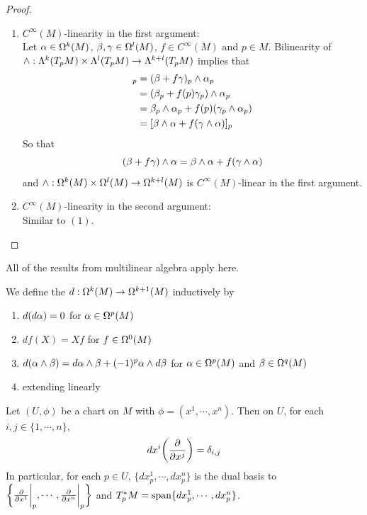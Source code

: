 \documentclass{book}
\begin{document}
	\begin{proof}\
	\begin{enumerate}
	\item 
	$C^{\infty}(M)$-linearity in the first argument:\\
	Let $\alpha \in \Omega^k(M)$, $\beta, \gamma \in \Omega^l(M)$, $f \in C^{\infty}(M)$ and $p \in M$. Bilinearity of $\wedge: \Lambda^k(T_pM) \times \Lambda^l(T_pM) \rightarrow \Lambda^{k+l}(T_pM)$ implies that
	\begin{align*}
	[(\be + f \gam ) \wedge \al]_p 
	& = (\be + f \gam)_p \wedge \al_p  \\
	& =(\be_p + f(p) \gam_p) \wedge \al_p \\
	& = \be_p \wedge \al_p + f(p)( \gam_p \wedge \al_p) \\
	& =  [\be \wedge \al + f (\gam \wedge \al)]_p \\
	\end{align*}
	So that $$(\beta + f \gamma ) \wedge \alpha = \beta \wedge \alpha  + f  (\gamma \wedge \alpha)$$ and $\wedge: \Omega^k(M) \times \Omega^l(M) \rightarrow \Omega^{k+l}(M) $ is $C^{\infty}(M)$-linear in the first argument. 
	\item $C^{\infty}(M)$-linearity in the second argument:\\
	Similar to $(1)$.
	\end{enumerate}
	\end{proof}
	
	\begin{note}
		All of the results from multilinear algebra apply here.
	\end{note}

	\begin{defn}
		We define the  $d: \Omega^k(M) \rightarrow \Omega^{k+1}(M)$ inductively by 
		\begin{enumerate}
			\item $d(d \alpha) = 0$ for $\alpha \in \Omega^p(M)$
			\item $df(X) = Xf$ for $f \in \Omega^0(M)$
			\item $d(\alpha \wedge \beta) = d\alpha \wedge \beta + (-1)^p \alpha \wedge d\beta$ for $\alpha \in \Omega^p(M)$ and $\beta \in \Omega^q(M)$
			\item extending linearly
		\end{enumerate}
	\end{defn}

	\begin{ex}
		Let $(U, \phi)$ be a chart on $M$ with $\phi = (x^1, \cdots, x^n)$. Then on $U$, for each $i,j \in \{1, \cdots, n\}$, $$dx^i\bigg(\frac{\partial}{\partial x^j} \bigg) = \delta_{i,j}$$ 
		In particular, for each $p \in U$, $\{dx^1_p, \cdots, dx^n_p \}$ is the dual basis to $\bigg \{ \frac{\partial}{\partial x^1} \bigg|_p, \cdots, \frac{\partial}{\partial x^n} \bigg|_p \bigg \}$ and $T_p^*M = \operatorname{span}\{dx^1_p, \cdots, dx^n_p\}$.
	\end{ex}
\end{document}
